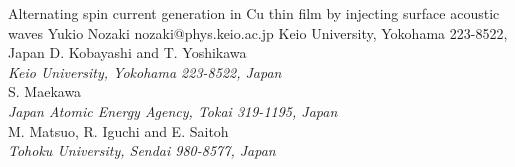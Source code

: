 \begin{conf-abstract}[]
{Alternating spin current generation in Cu thin film by injecting surface acoustic waves}
{\color{blue} Yukio Nozaki}
{nozaki@phys.keio.ac.jp}
{Keio University, Yokohama 223-8522, Japan}
{{\color{blue}D. Kobayashi and T. Yoshikawa}\\ \textit{Keio University, Yokohama 223-8522, Japan}\\ 
{\color{blue}S. Maekawa}\\ \textit{ Japan Atomic Energy Agency, Tokai 319-1195, Japan}\\ 
{\color{blue}M. Matsuo, R. Iguchi and E. Saitoh}\\ \textit{Tohoku University, Sendai 980-8577, Japan}\\ 
\decofourleft \decofourright}





\printbibliography[heading=none]

\end{conf-abstract}
